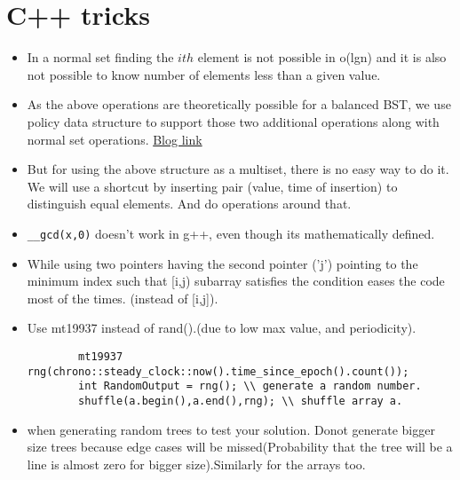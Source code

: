 \documentclass[../Notes.tex]{subfiles}
\begin{document}
\chapter{C++ tricks}

\begin{itemize}
	\item In a normal set finding the $ith$ element is not possible in o(lgn)
	and it is also not possible to know number of elements less than a given value.
	\item As the above operations are theoretically possible for a balanced BST, we use policy data structure to support those two additional operations along with normal set operations. \href{https://codeforces.com/blog/entry/11080}{Blog link}
	\item But for using the above structure as a multiset, there is no easy way to do it. We will use a shortcut by inserting pair (value, time of insertion) to distinguish equal elements. And do operations around that.
	\item \texttt{\_\_gcd(x,0)} doesn't work in g++, even though its mathematically defined.
	\item While using two pointers having the second pointer ('j') pointing to the minimum index such that [i,j) subarray satisfies the condition eases the code most of the times. (instead of [i,j]).
	\item Use mt19937 instead of rand().(due to low max value, and periodicity).
	\begin{lstlisting}
		mt19937 rng(chrono::steady_clock::now().time_since_epoch().count());
		int RandomOutput = rng(); \\ generate a random number.
		shuffle(a.begin(),a.end(),rng); \\ shuffle array a.
	\end{lstlisting}
	\item when generating random trees to test your solution. Donot generate bigger size trees because edge cases will be missed(Probability that the tree will be a line is almost zero for bigger size).Similarly for the arrays too.
\end{itemize}
\end{document}
